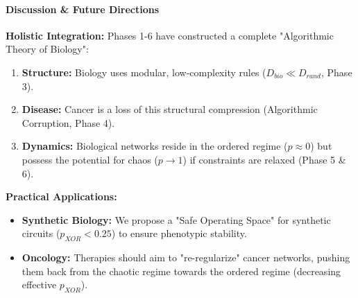 \paragraph{Discussion \& Future Directions}
\textbf{Holistic Integration:}
Phases 1-6 have constructed a complete "Algorithmic Theory of Biology":
\begin{enumerate}
    \item \textbf{Structure:} Biology uses modular, low-complexity rules ($D_{bio} \ll D_{rand}$, Phase 3).
    \item \textbf{Disease:} Cancer is a loss of this structural compression (Algorithmic Corruption, Phase 4).
    \item \textbf{Dynamics:} Biological networks reside in the ordered regime ($p \approx 0$) but possess the potential for chaos ($p \to 1$) if constraints are relaxed (Phase 5 \& 6).
\end{enumerate}
\textbf{Practical Applications:}
\begin{itemize}
    \item \textbf{Synthetic Biology:} We propose a "Safe Operating Space" for synthetic circuits ($p_{XOR} < 0.25$) to ensure phenotypic stability.
    \item \textbf{Oncology:} Therapies should aim to "re-regularize" cancer networks, pushing them back from the chaotic regime towards the ordered regime (decreasing effective $p_{XOR}$).
\end{itemize}


